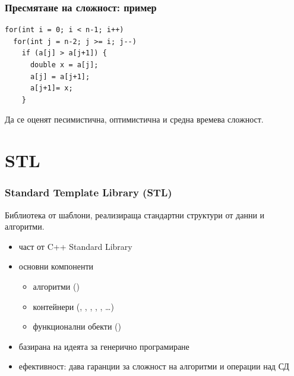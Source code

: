 \documentclass[alsotrans]{beamerswitch}
\begin{document}
\begin{frame}[fragile]
  \frametitle{Пресмятане на сложност: пример}

\begin{lstlisting}
for(int i = 0; i < n-1; i++)
  for(int j = n-2; j >= i; j--)
    if (a[j] > a[j+1]) {
      double x = a[j];
      a[j] = a[j+1];
      a[j+1]= x;
    }
\end{lstlisting}

Да се оценят песимистична, оптимистична и средна времева сложност.
\end{frame}

\section{STL}

\begin{frame}
  \frametitle{Standard Template Library (STL)}

  Библиотека от шаблони, реализираща стандартни структури от данни и алгоритми.

  \begin{itemize}
  \item част от C++ Standard Library
  \item основни компоненти
    \begin{itemize}
    \item алгоритми ()
    \item контейнери (, , , , , \ldots)
    \item функционални обекти ()
    \end{itemize}
  \item базирана на идеята за генерично програмиране
  \item ефективност: дава гаранции за сложност на алгоритми и операции над СД
  \end{itemize}
\end{frame}
\end{document}
